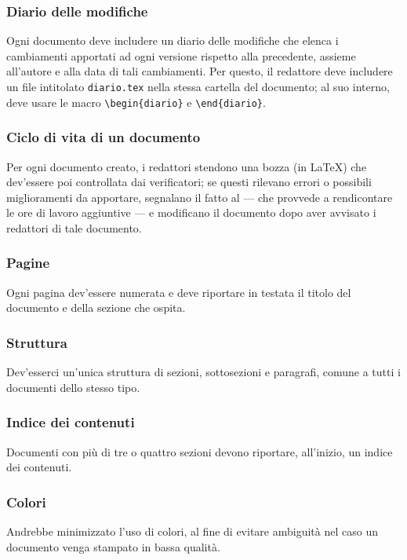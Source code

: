 \subsubsection{Diario delle modifiche} Ogni documento deve includere un diario delle modifiche che elenca i cambiamenti apportati ad ogni versione rispetto alla precedente, assieme all'autore e alla data di tali cambiamenti. Per questo, il redattore deve includere un file intitolato \texttt{diario.tex} nella stessa cartella del documento; al suo interno, deve usare le macro \texttt{\textbackslash begin\{diario\}} e \texttt{\textbackslash end\{diario\}}.

\subsubsection{Ciclo di vita di un documento} Per ogni documento creato, i redattori stendono una bozza (in \LaTeX) che dev'essere poi controllata dai verificatori; se questi rilevano errori o possibili miglioramenti da apportare, segnalano il fatto al  --- che provvede a rendicontare le ore di lavoro aggiuntive --- e modificano il documento dopo aver avvisato i redattori di tale documento.

\subsubsection{Pagine} Ogni pagina dev'essere numerata e deve riportare in testata il titolo del documento e della sezione che ospita. %

\subsubsection{Struttura} Dev'esserci un'unica struttura di sezioni, sottosezioni e paragrafi, comune a tutti i documenti dello stesso tipo.

\subsubsection{Indice dei contenuti} Documenti con più di tre o quattro sezioni devono riportare, all'inizio, un indice dei contenuti.

\subsubsection{Colori} Andrebbe minimizzato l'uso di colori, al fine di evitare ambiguità nel caso un documento venga stampato in bassa qualità.

